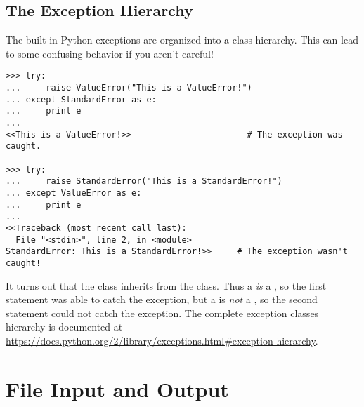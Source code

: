 \begin{comment}
\subsection*{Chaining Exceptions}
\begin{lstlisting}
>>> try:
>>>     raise ValueError("First Exception")
>>> except ValueError as e:
>>>     raise ZeroDivisionError("Second Exception") from e
\end{lstlisting}
This syntax makes it possible to see where an error originated from and to ``pass it up'' to the next process.
\end{comment}

\subsection*{The Exception Hierarchy} %

The built-in Python exceptions are organized into a class hierarchy.
This can lead to some confusing behavior if you aren't careful!

\begin{lstlisting}
>>> try:
...     raise ValueError("This is a ValueError!")
... except StandardError as e:
...     print e
...
<<This is a ValueError!>>                       # The exception was caught.

>>> try:
...     raise StandardError("This is a StandardError!")
... except ValueError as e:
...     print e
...
<<Traceback (most recent call last):
  File "<stdin>", line 2, in <module>
StandardError: This is a StandardError!>>     # The exception wasn't caught!
\end{lstlisting}

It turns out that the  class inherits from the  class.
Thus a  \emph{is} a , so the first  statement was able to catch the exception, but a  is \emph{not} a , so the second  statement could not catch the exception.
The complete exception classes hierarchy is documented at \url{https://docs.python.org/2/library/exceptions.html#exception-hierarchy}.

\section*{File Input and Output} %

